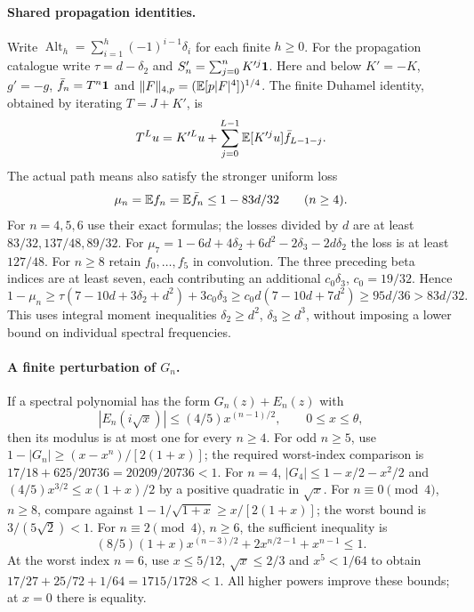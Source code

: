 \paragraph{Shared propagation identities.}\label{calc:duhamel}
Write $\operatorname{Alt}_h=\sum_{i=1}^h(-1)^{i-1}\delta_{i}$ for each finite $h\ge0$.
For the propagation catalogue write $\tau=d-\delta_{2}$ and $S'_n=\sum_{j=0}^nK'^j\mathbf1$.
Here and below $K'=-K$, $g'=-g$, $\bar f_{n}=T^n\mathbf1$ and
$\|F\|_{4,p}=(\mathbb E[p|F|^4])^{1/4}$.
The finite Duhamel identity, obtained by iterating $T=J+K'$, is
\begin{equation}\label{eq:compact-duhamel}
 T^Lu=K'^Lu+\sum_{j=0}^{L-1}\mathbb E[K'^ju]\bar f_{L-1-j}.
\end{equation}
The actual path means also satisfy the stronger uniform loss
\begin{equation}\label{eq:compact-strong-path-means}
 \mu_n=\mathbb E f_n=\mathbb E \bar f_{n}\le1-83d/32\qquad(n\ge4).
\end{equation}
For $n=4,5,6$ use their exact formulas; the losses divided by $d$ are at
least $83/32,137/48,89/32$. For
$\mu_7=1-6d+4\delta_{2}+6d^2-2\delta_{3}-2d\delta_{2}$ the loss is at least $127/48$.
For $n\ge8$ retain $f_0,\ldots,f_5$ in convolution. The three preceding
beta indices are at least seven, each contributing an additional
$c_0\delta_{3}$, $c_0=19/32$. Hence
\[
 1-\mu_n\ge\tau(7-10d+3\delta_{2}+d^2)+3c_0\delta_{3}
 \ge c_0d(7-10d+7d^2)\ge95d/36>83d/32.
\]
This uses integral moment inequalities $\delta_{2}\ge d^2$, $\delta_{3}\ge d^3$,
without imposing a lower bound on individual spectral frequencies.

\paragraph{A finite perturbation of $G_n$.}
If a spectral polynomial has the form $G_n(z)+E_n(z)$ with
\[
 |E_n(i\sqrt x)|\le(4/5)x^{(n-1)/2},\qquad 0\le x\le\theta,
\]
then its modulus is at most one for every $n\ge4$.
For odd $n\ge5$, use
$1-|G_n|\ge(x-x^n)/[2(1+x)]$; the required worst-index comparison is
$17/18+625/20736=20209/20736<1$.
For $n=4$, $|G_4|\le1-x/2-x^2/2$ and
$(4/5)x^{3/2}\le x(1+x)/2$ by a positive quadratic in $\sqrt x$.
For $n\equiv0\pmod4$, $n\ge8$, compare against
$1-1/\sqrt{1+x}\ge x/[2(1+x)]$; the worst bound is
$3/(5\sqrt2)<1$.
For $n\equiv2\pmod4$, $n\ge6$, the sufficient inequality is
\[
 (8/5)(1+x)x^{(n-3)/2}+2x^{n/2-1}+x^{n-1}\le1.
\]
At the worst index $n=6$, use $x\le5/12$, $\sqrt x\le2/3$ and
$x^5<1/64$ to obtain $17/27+25/72+1/64=1715/1728<1$.
All higher powers improve these bounds; at $x=0$ there is equality.

